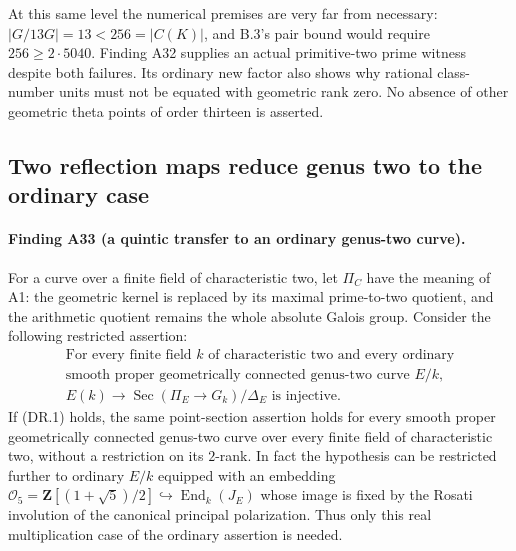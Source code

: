 \documentclass[11pt,a4paper]{article}
\begin{document}
At this same level the numerical premises are very far from
necessary: $|G/13G|=13<256=|C(K)|$, and B.3's pair bound would
require $256\ge2\cdot5040$.  Finding A32 supplies an actual
primitive-two prime witness despite both failures.  Its ordinary
new factor also shows why rational class-number units must not
be equated with geometric rank zero.  No absence of other
geometric theta points of order thirteen is asserted.


\subsection{Two reflection maps reduce genus two to the ordinary case}
\label{sec:quintic-ordinary-reduction}

\paragraph{Finding A33 (a quintic transfer to an ordinary genus-two curve).}
For a curve over a finite field of characteristic two, let $\Pi_C$ have
the meaning of A1: the geometric kernel is replaced by its maximal
prime-to-two quotient, and the arithmetic quotient remains the whole
absolute Galois group.  Consider the following restricted assertion:
\[
 \begin{gathered}
 \text{For every finite field $k$ of characteristic two and every ordinary}\\
 \text{smooth proper geometrically connected genus-two curve $E/k$,}\\
 E(k)\longrightarrow\operatorname{Sec}(\Pi_E\to G_k)/\Delta_E
 \text{ is injective.}
 \end{gathered}
 \tag{DR.1}
\]
If (DR.1) holds, the same point-section assertion holds for every
smooth proper geometrically connected genus-two curve over every finite
field of characteristic two, without a restriction on its $2$-rank.
In fact the hypothesis can be restricted further to ordinary $E/k$
equipped with an embedding
$\mathcal O_5=\mathbf Z[(1+\sqrt5)/2]\hookrightarrow
\operatorname{End}_k(J_E)$ whose image is fixed by the Rosati involution
of the canonical principal polarization.  Thus only this real
multiplication case of the ordinary assertion is needed.
\end{document}

